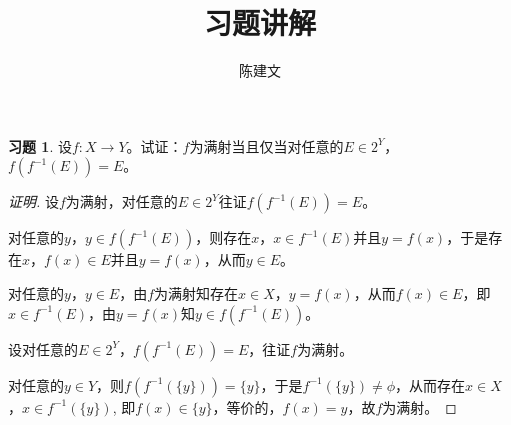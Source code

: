\documentclass{beamer}
\begin{document}
\begin{CJK*}{UTF8}{gbsn}


  
\theoremstyle{definition}
\newtheorem{Def}{定义}
\theoremstyle{example}
\newtheorem*{Ex}{例：}
\newtheorem*{Exercise}{习题}

\date{}
\author{陈建文}
\title{习题讲解}

\begin{frame}
  \titlepage
\end{frame}
\begin{frame}

\begin{Exercise}
   设$f:X\to Y$。试证：$f$为满射当且仅当对任意的$E\in 2^Y$，$f(f^{-1}(E))=E$。
\end{Exercise}
\pause
\begin{proof}[证明]\justifying\let\raggedright\justifying
  设$f$为满射，对任意的$E\in 2^Y$往证$f(f^{-1}(E))=E$。
  \pause

  
  对任意的$y$，$y\in f(f^{-1}(E))$，\pause 则存在$x$，$x\in f^{-1}(E)$并且$y=f(x)$，\pause 于是存在$x$，$f(x) \in E$并且$y=f(x)$，\pause 从而$y\in E$。

 \pause  
  对任意的$y$，$y\in E$，\pause 由$f$为满射知存在$x\in X$，$y=f(x)$，\pause 从而$f(x)\in E$，\pause 即$x\in f^{-1}(E)$，\pause 由$y=f(x)$知$y\in f(f^{-1}(E))$。

  \pause
  设对任意的$E\in 2^Y$，$f(f^{-1}(E))=E$，往证$f$为满射。

  \pause
  对任意的$y\in Y$，\pause 则$f(f^{-1}(\{y\}))=\{y\}$，\pause 于是$f^{-1}(\{y\})\neq \phi$，\pause 从而存在$x\in X$，$x\in f^{-1}(\{y\})$, \pause 即$f(x)\in \{y\}$，\pause 等价的，$f(x)=y$，\pause 故$f$为满射。
\end{proof}
  
\end{frame}

\end{CJK*}
\end{document}
